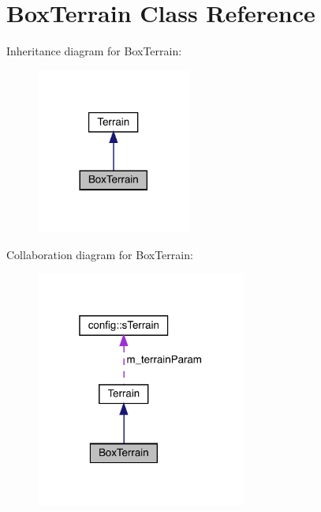 \hypertarget{class_box_terrain}{}\section{Box\+Terrain Class Reference}
\label{class_box_terrain}


Inheritance diagram for Box\+Terrain\+:\nopagebreak
\begin{figure}[H]
\begin{center}
\leavevmode
\includegraphics[width=144pt]{class_box_terrain__inherit__graph}
\end{center}
\end{figure}


Collaboration diagram for Box\+Terrain\+:\nopagebreak
\begin{figure}[H]
\begin{center}
\leavevmode
\includegraphics[width=196pt]{class_box_terrain__coll__graph}
\end{center}
\end{figure}
